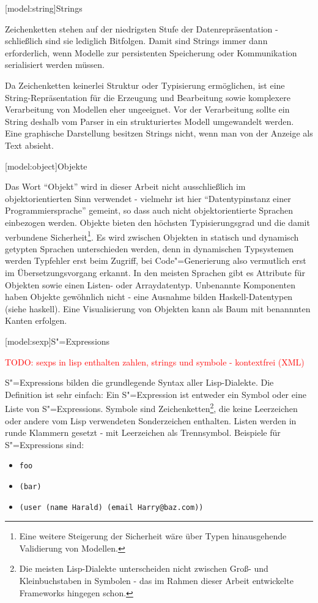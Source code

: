 \documentclass[11pt, a4paper, bibgerm]{book}
\newcommand\icode[1]{\lstinline?#1?}
\newcommand{\todo}[1]{
  \textcolor{red}{TODO: #1}
}
\newcommand\lsection{}
\newcommand\sref{}
\newcommand{\sees}[1]{(siehe \sref{#1})}
\newcommand{\sexp}{S"=Expression}
\newcommand{\sexps}{S"=Expressions}
\newcommand{\cgen}{Code"=Generierung}
\begin{document}
\lsection[model:string]{Strings}

Zeichenketten stehen auf der niedrigsten Stufe der Datenrepräsentation -
schließlich sind sie lediglich Bitfolgen. Damit sind Strings immer dann
erforderlich, wenn Modelle zur persistenten Speicherung oder
Kommunikation serialisiert werden müssen.

Da Zeichenketten keinerlei Struktur oder Typisierung ermöglichen, ist
eine String-Repräsentation für die Erzeugung und Bearbeitung sowie
komplexere Verarbeitung von Modellen eher ungeeignet. Vor der
Verarbeitung sollte ein String deshalb vom Parser in ein strukturiertes
Modell umgewandelt werden. Eine graphische Darstellung besitzen Strings
nicht, wenn man von der Anzeige als Text absieht.

\lsection[model:object]{Objekte}

Das Wort ``Objekt'' wird in dieser Arbeit nicht ausschließlich im
objektorientierten Sinn verwendet - vielmehr ist hier "`Datentypinstanz
einer Programmiersprache"' gemeint, so dass auch nicht objektorientierte
Sprachen einbezogen werden. Objekte bieten den höchsten Typisierungsgrad
und die damit verbundene Sicherheit\footnote{Eine weitere Steigerung der
  Sicherheit wäre über Typen hinausgehende Validierung von
  Modellen.}. Es wird zwischen Objekten in statisch und dynamisch
getypten Sprachen unterschieden werden, denn in dynamischen Typsystemen
werden Typfehler erst beim Zugriff, bei \cgen{} also vermutlich erst im
Übersetzungsvorgang erkannt. In den meisten Sprachen gibt es Attribute
für Objekten sowie einen Listen- oder Arraydatentyp. Unbenannte
Komponenten haben Objekte gewöhnlich nicht - eine Ausnahme bilden
Haskell-Datentypen \sees{haskell}. Eine Visualisierung von
Objekten kann als Baum mit benannnten Kanten erfolgen.

\lsection[model:sexp]{\sexps}

\todo{sexps in lisp enthalten zahlen, strings und symbole - kontextfrei (XML)}

\sexps{} bilden die grundlegende Syntax aller Lisp-Dialekte. Die
Definition ist sehr einfach: Ein \sexp{} ist entweder ein Symbol oder
eine Liste von \sexps{}. Symbole sind Zeichenketten\footnote{Die meisten
  Lisp-Dialekte unterscheiden nicht zwischen Groß- und Kleinbuchstaben
  in Symbolen - das im Rahmen dieser Arbeit entwickelte Frameworks
  hingegen schon.}, die keine Leerzeichen oder andere vom Lisp
verwendeten Sonderzeichen enthalten. Listen werden in runde Klammern
gesetzt - mit Leerzeichen als Trennsymbol. Beispiele für \sexps{} sind:
\begin{itemize}
\item \icode{foo}
\item \icode{(bar)}
\item \icode{(user (name Harald) (email Harry@baz.com))}
\end{itemize}
\end{document}
